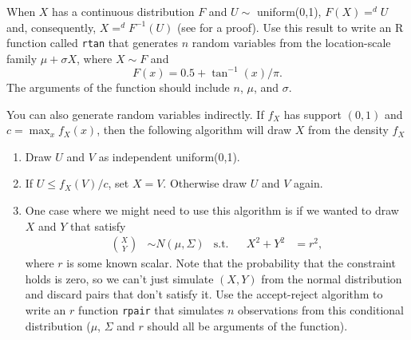 

\begin{hw}
  When $X$ has a continuous distribution $F$ and $U \sim$
  uniform(0,1), $F(X) =^d U$ and, consequently, $X =^d F^{-1}(U)$ (see
  \citealt[Theorem 2.1.10]{CB02} for a proof). Use this result to
  write an R function called \texttt{rtan} that generates $n$ random
  variables from the location-scale family $\mu + \sigma X$, where $X
  \sim F$ and
  \begin{equation*}
    F(x) = 0.5 + \tan^{-1}(x)/\pi.
  \end{equation*}
  The arguments of the function should include $n$, $\mu$, and $\sigma$.
\end{hw}

\begin{hw}
  You can also generate random variables indirectly. If $f_X$ has
  support $(0,1)$ and $c = \max_x f_X(x)$, then the following
  algorithm will draw $X$ from the density $f_X$ \citep[see][Section
  5.6.2]{CB02}
  \begin{enumerate}
  \item Draw $U$ and $V$ as independent uniform(0,1).
  \item If $U \leq f_X(V) / c$, set $X = V$. Otherwise draw $U$ and $V$
    again.
  \item One case where we might need to use this algorithm is if we
    wanted to draw $X$ and $Y$ that satisfy
    \begin{align*}
      \binom{X}{Y} &\sim N(\mu,\Sigma) & \text{s.t.}&& X^2 + Y^2 &= r^2,
    \end{align*}
    where $r$ is some known scalar. Note that the probability that
    the constraint holds is zero, so we can't just simulate $(X,Y)$
    from the normal distribution and discard pairs that don't satisfy
    it. Use the accept-reject algorithm to write an $r$ function
    \texttt{rpair} that simulates $n$ observations from this
    conditional distribution ($\mu$, $\Sigma$ and $r$ should all be arguments
    of the function).
  \end{enumerate}
\end{hw}

